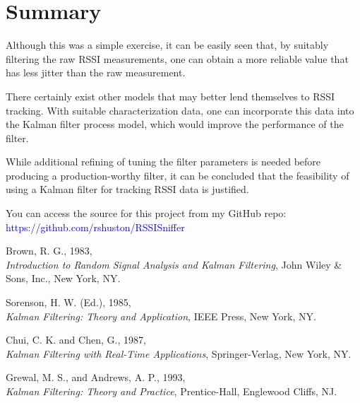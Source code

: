 \documentclass[12pt]{article}
\begin{document}
%
%

\section{Summary}

Although this was a simple exercise, it can be easily seen that, by suitably filtering the
raw RSSI measurements, one can obtain a more reliable value that has less jitter than the
raw measurement.

There certainly exist other models that may better lend themselves to RSSI tracking. With
suitable characterization data, one can incorporate this data into the Kalman filter
process model, which would improve the performance of the filter.

While additional refining of tuning the filter parameters is needed before producing a
production-worthy filter, it can be concluded that the feasibility of using a Kalman filter
for tracking RSSI data is justified.

You can access the source for this project from my GitHub repo: \\
\textcolor{blue}{https://github.com/rshuston/RSSISniffer}

\renewcommand{\refname}{\normalsize{General References}}

\begin{thebibliography}{9}

Brown, R. G., 1983, \\
\emph{Introduction to Random Signal Analysis and Kalman Filtering},
John Wiley \& Sons, Inc., New York, NY.

Sorenson, H. W. (Ed.), 1985, \\
\emph{Kalman Filtering: Theory and Application},
IEEE Press, New York, NY.

Chui, C. K. and Chen, G., 1987, \\
\emph{Kalman Filtering with Real-Time Applications},
Springer-Verlag, New York, NY.

Grewal, M. S., and Andrews, A. P., 1993, \\
\emph{Kalman Filtering: Theory and Practice},
Prentice-Hall, Englewood Cliffs, NJ.

\end{thebibliography}
\end{document}
